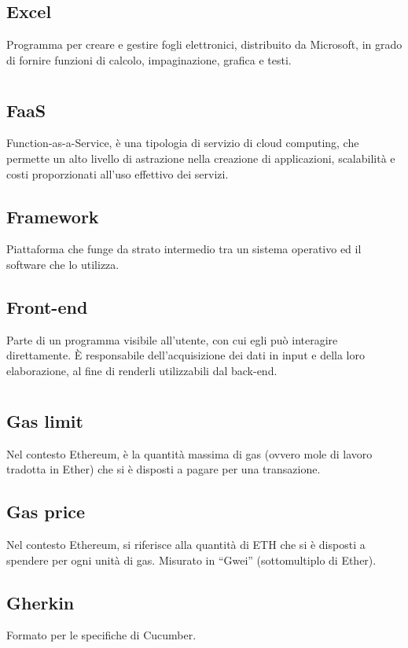 	\subsection*{Excel}
	Programma per creare e gestire fogli elettronici, distribuito da Microsoft, in grado di fornire funzioni di calcolo, impaginazione, grafica e testi.
\pagebreak
\section[F]{}
	\subsection*{FaaS}
	Function-as-a-Service, è una tipologia di servizio di cloud computing, che permette un alto livello di astrazione nella creazione di applicazioni, scalabilità e costi proporzionati all’uso effettivo dei servizi.
	\subsection*{Framework}
	Piattaforma che funge da strato intermedio tra un sistema operativo ed il software che lo utilizza.
	\subsection*{Front-end}
	Parte di un programma visibile all’utente, con cui egli può interagire direttamente. È responsabile dell’acquisizione dei dati in input e della loro elaborazione, al fine di renderli utilizzabili dal back-end.
\pagebreak
\section[G]{}
	\subsection*{Gas limit}
	Nel contesto Ethereum, è la quantità massima di gas (ovvero mole di lavoro tradotta in Ether) che si è disposti a pagare per una transazione.
	\subsection*{Gas price}
	Nel contesto Ethereum, si riferisce alla quantità di ETH che si è disposti a spendere per ogni unità di gas. Misurato in “Gwei” (sottomultiplo di Ether).
	\subsection*{Gherkin}
	Formato per le specifiche di Cucumber.
